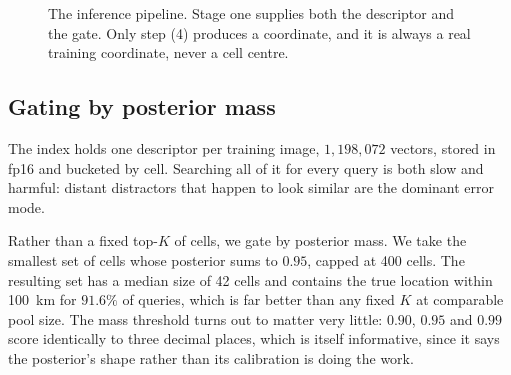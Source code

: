 \documentclass[11pt,a4paper]{article}
\begin{document}
\begin{figure}[t]
\centering
\small
{}
\caption{The inference pipeline. Stage one supplies both the descriptor and the gate. Only
step (4) produces a coordinate, and it is always a real training coordinate, never a cell
centre.}
\label{fig:pipeline}
\end{figure}

\subsection{Gating by posterior mass}

The index holds one descriptor per training image, $1{,}198{,}072$ vectors, stored in fp16
and bucketed by cell. Searching all of it for every query is both slow and harmful: distant
distractors that happen to look similar are the dominant error mode.

Rather than a fixed top-$K$ of cells, we gate by posterior mass. We take the smallest set of
cells whose posterior sums to $0.95$, capped at 400 cells. The resulting set has a median
size of 42 cells and contains the true location within 100~km for $91.6\%$ of queries, which
is far better than any fixed $K$ at comparable pool size. The mass threshold turns out to
matter very little: $0.90$, $0.95$ and $0.99$ score identically to three decimal places,
which is itself informative, since it says the posterior's shape rather than its calibration
is doing the work.
\end{document}
